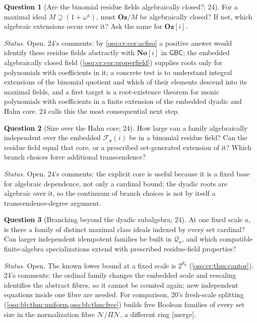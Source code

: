 \documentclass[11pt,letterpaper]{article}
\numberwithin{equation}{section}
\theoremstyle{definition}
\newtheorem{question}[question]{Question}
\theoremstyle{remark}
\theoremstyle{plain}
\newcommand{\No}{\mathbf{No}}
\newcommand{\Oz}{\mathbf{Oz}}
\newcommand{\SC}{\No[i]}
\newcommand{\GOz}{\Oz[i]}
\newcommand{\FF}{\mathscr F}         %
\newcommand{\Qa}{\mathcal Q}         %
\newcommand{\NN}{\mathcal N}         %
\newcommand{\merge}{\textup{\textsf{[merge]}}}
\begin{document}
\begin{question}[Are the binomial residue fields algebraically closed?; 24]\label{osq:cr:q:closed}
For a maximal ideal $M\supseteq(1+\omega^a)$, must $\Oz/M$ be algebraically closed? If not, which algebraic extensions occur over it? Ask the same for
$\GOz$.
\end{question}
\emph{Status.} Open. 24's comments: by \cref{osq:cr:cor:acfiso} a positive answer would identify these residue fields abstractly with $\SC$ in
$\mathsf{GBC}$; the embedded algebraically closed field (\cref{osq:cr:cor:properfield}) supplies roots only for polynomials with coefficients in it; a
concrete test is to understand integral extensions of the binomial quotient and which of their elements descend into its maximal fields, and a first
target is a root-existence theorem for monic polynomials with coefficients in a finite extension of the embedded dyadic and Hahn core. 24 calls this the
most consequential next step.

\begin{question}[Size over the Hahn core; 24]\label{osq:cr:q:relative}
How large can a family algebraically independent over the embedded $\FF_a(i)$ be in a binomial residue field? Can the residue field equal that core, or a
prescribed set-generated extension of it? Which branch choices force additional transcendence?
\end{question}
\emph{Status.} Open. 24's comments: the explicit core is useful because it is a fixed base for algebraic dependence, not only a cardinal bound; the dyadic
roots are algebraic over it, so the continuum of branch choices is not by itself a transcendence-degree argument.

\begin{question}[Branching beyond the dyadic subalgebra; 24]\label{osq:cr:q:branching}
At one fixed scale $a$, is there a family of distinct maximal class ideals indexed by every set cardinal? Can larger independent idempotent families be
built in $\Qa_a$, and which compatible finite-algebra specializations extend with prescribed residue-field properties?
\end{question}
\emph{Status.} Open. The known lower bound at a fixed scale is $2^{\aleph_0}$ (\cref{osq:cr:thm:cantor}). 24's comments: the ordinal family changes the
embedded scale and rescaling identifies the abstract fibres, so it cannot be counted again; new independent equations inside one fibre are needed.
For comparison, 20's fresh-scale splitting (\cref{osq:bb:thm:uniform,osq:bb:thm:free}) builds free Boolean families of every set size in the
normalization fibre $\NN/\Pi\NN$, a different ring \merge.
\end{document}

